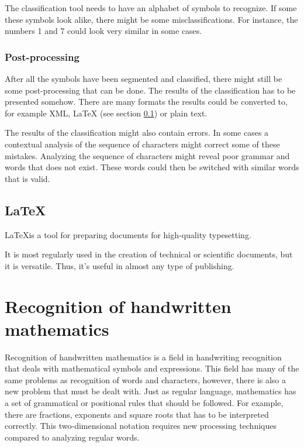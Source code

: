 The classification tool needs to have an alphabet of symbols to recognize. If some these symbols look alike, there might be some misclassifications. For instance, the numbers 1 and 7 could look very similar in some cases.

\subsubsection{Post-processing}
After all the symbols have been segmented and classified, there might still be some post-processing that can be done. The results of the classification has to be presented somehow. There are many formats the results could be converted to, for example XML, LaTeX (see section \ref{latex}) or plain text.

The results of the classification might also contain errors. In some cases a contextual analysis of the sequence of characters might correct some of these mistakes. Analyzing the sequence of characters might reveal poor grammar and words that does not exist. These words could then be switched with similar words that is valid.

\subsection{\LaTeX}
\label{latex}

\LaTeX is a tool for preparing documents for high-quality typesetting. 

It is most regularly used in the creation of technical or scientific documents, but it is versatile. Thus, it's useful in almost any type of publishing.\parencite{_introduction_2018} \\ %

\section{Recognition of handwritten mathematics} 
\label{recognition of handwritten mathematics}
Recognition of handwritten mathematics is a field in handwriting recognition that deals with mathematical symbols and expressions. This field has many of the same problems as recognition of words and characters, however, there is also a new problem that must be dealt with. Just as regular language, mathematics has a set of grammatical or positional rules that should be followed. For example, there are fractions, exponents and square roots that has to be interpreted correctly. This two-dimensional notation requires new processing techniques compared to analyzing regular words.

